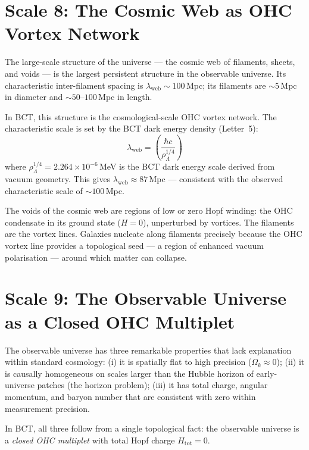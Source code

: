 \documentclass[aps,prl,twocolumn,superscriptaddress,floatfix]{revtex4-2}
\begin{document}
\section{Scale 8: The Cosmic Web as OHC Vortex Network}

The large-scale structure of the universe --- the cosmic web of
filaments, sheets, and voids --- is the largest persistent
structure in the observable universe. Its characteristic
inter-filament spacing is $\lambda_\mathrm{web} \sim
100$\,Mpc; its filaments are $\sim 5$\,Mpc in diameter and
$\sim 50$--$100$\,Mpc in length.

In BCT, this structure is the cosmological-scale OHC vortex
network. The characteristic scale is set by the BCT dark
energy density (Letter~5):
\begin{equation}
  \lambda_\mathrm{web} = \left(\frac{\hbar c}{\rho_\Lambda^{1/4}}\right)
  \label{eq:web}
\end{equation}
where $\rho_\Lambda^{1/4} = 2.264 \times 10^{-6}$\,MeV is the
BCT dark energy scale derived from vacuum geometry.
This gives $\lambda_\mathrm{web} \approx 87$\,Mpc --- consistent
with the observed characteristic scale of $\sim 100$\,Mpc.

The voids of the cosmic web are regions of low or zero
Hopf winding: the OHC condensate in its ground state ($H = 0$),
unperturbed by vortices. The filaments are the vortex lines.
Galaxies nucleate along filaments precisely because the OHC
vortex line provides a topological seed --- a region of
enhanced vacuum polarisation --- around which matter can
collapse.

\section{Scale 9: The Observable Universe as a Closed OHC Multiplet}

The observable universe has three remarkable properties that
lack explanation within standard cosmology:
(i) it is spatially flat to high precision ($\Omega_k \approx 0$);
(ii) it is causally homogeneous on scales larger than the
Hubble horizon of early-universe patches (the horizon problem);
(iii) it has total charge, angular momentum, and baryon number
that are consistent with zero within measurement precision.

In BCT, all three follow from a single topological fact:
the observable universe is a \textit{closed OHC multiplet}
with total Hopf charge $H_\mathrm{tot} = 0$.
\end{document}
